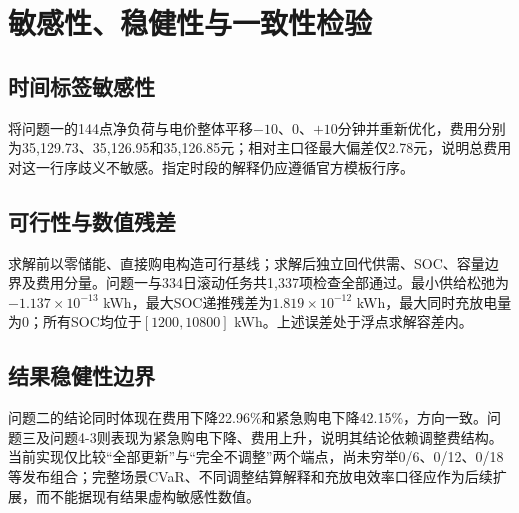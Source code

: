 \section{敏感性、稳健性与一致性检验}
\subsection{时间标签敏感性}
将问题一的144点净负荷与电价整体平移$-10$、0、$+10$分钟并重新优化，费用分别为35,129.73、35,126.95和35,126.85元；相对主口径最大偏差仅2.78元，说明总费用对这一行序歧义不敏感。指定时段的解释仍应遵循官方模板行序。
\subsection{可行性与数值残差}
求解前以零储能、直接购电构造可行基线；求解后独立回代供需、SOC、容量边界及费用分量。问题一与334日滚动任务共1,337项检查全部通过。最小供给松弛为$-1.137\times10^{-13}$ kWh，最大SOC递推残差为$1.819\times10^{-12}$ kWh，最大同时充放电量为0；所有SOC均位于$[1200,10800]$ kWh。上述误差处于浮点求解容差内。
\subsection{结果稳健性边界}
问题二的结论同时体现在费用下降22.96\%和紧急购电下降42.15\%，方向一致。问题三及问题4-3则表现为紧急购电下降、费用上升，说明其结论依赖调整费结构。当前实现仅比较“全部更新”与“完全不调整”两个端点，尚未穷举0/6、0/12、0/18等发布组合；完整场景CVaR、不同调整结算解释和充放电效率口径应作为后续扩展，而不能据现有结果虚构敏感性数值。
